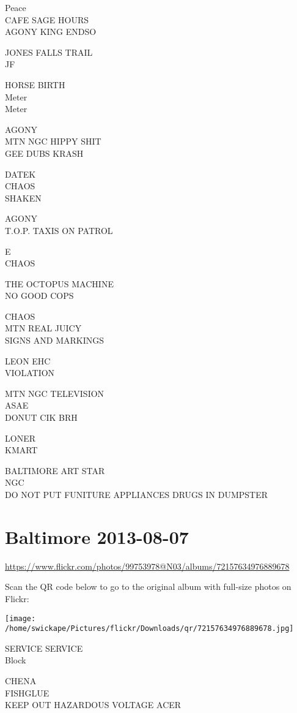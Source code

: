 \documentclass[10pt,letterpaper]{article}
\begin{document}
Peace\\
CAFE SAGE HOURS\\
AGONY KING ENDSO

JONES FALLS TRAIL\\
JF

HORSE BIRTH\\
Meter\\
Meter

AGONY\\
MTN NGC HIPPY SHIT\\
GEE DUBS KRASH

DATEK\\
CHAOS\\
SHAKEN

AGONY\\
T.O.P. TAXIS ON PATROL

E\\
CHAOS

THE OCTOPUS MACHINE\\
NO GOOD COPS

CHAOS\\
MTN REAL JUICY\\
SIGNS AND MARKINGS

LEON EHC\\
VIOLATION

MTN NGC TELEVISION\\
ASAE\\
DONUT CIK BRH

LONER\\
KMART

BALTIMORE ART STAR\\
NGC\\
DO NOT PUT FUNITURE APPLIANCES DRUGS IN DUMPSTER
\pagebreak

\section*{Baltimore 2013-08-07}

\url{https://www.flickr.com/photos/99753978@N03/albums/72157634976889678}

Scan the QR code below to go to the original album with full-size photos on Flickr:

\texttt{[image: /home/swickape/Pictures/flickr/Downloads/qr/72157634976889678.jpg]}
\pagebreak

SERVICE SERVICE\\
Block

CHENA\\
FISHGLUE\\
KEEP OUT HAZARDOUS VOLTAGE ACER
\end{document}
